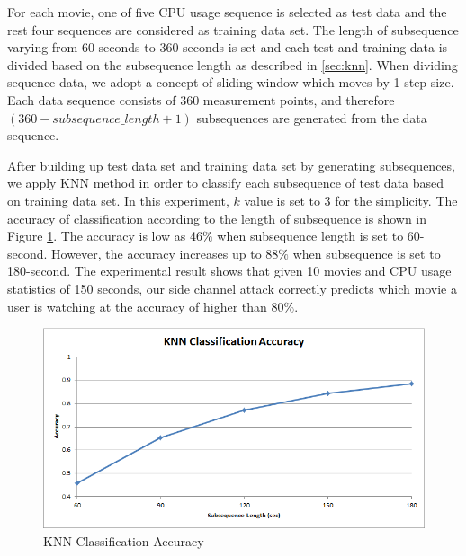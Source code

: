 For each movie, one of five CPU usage sequence is selected as test data and the rest four sequences are considered as training data set. 
The length of subsequence varying from 60 seconds to 360 seconds is set and each test and training data is divided based on the subsequence length as described in \ref{sec:knn}.
When dividing sequence data, we adopt a concept of sliding window which moves by 1 step size.
Each data sequence consists of $360$ measurement points, and therefore $(360 - subsequence\_length + 1)$ subsequences are generated from the data sequence. 

After building up test data set and training data set by generating subsequences, we apply KNN method in order to classify each subsequence of test data based on training data set. 
In this experiment, $k$ value is set to 3 for the simplicity.
The accuracy of classification according to the length of subsequence is shown in Figure \ref{fig:experiment_knn}.
The accuracy is low as 46$\%$ when subsequence length is set to 60-second.
However, the accuracy increases up to 88$\%$ when subsequence is set to 180-second.
The experimental result shows that given 10 movies and CPU usage statistics of 150 seconds, our side channel attack correctly predicts which movie a user is watching at the accuracy of higher than 80$\%$.

\begin{figure}[!ht]
\centering
\includegraphics[scale=0.50]{Figures/experiment_knn}
\caption{KNN Classification Accuracy}
\label{fig:experiment_knn}
\vspace{-5mm}
\end{figure}

